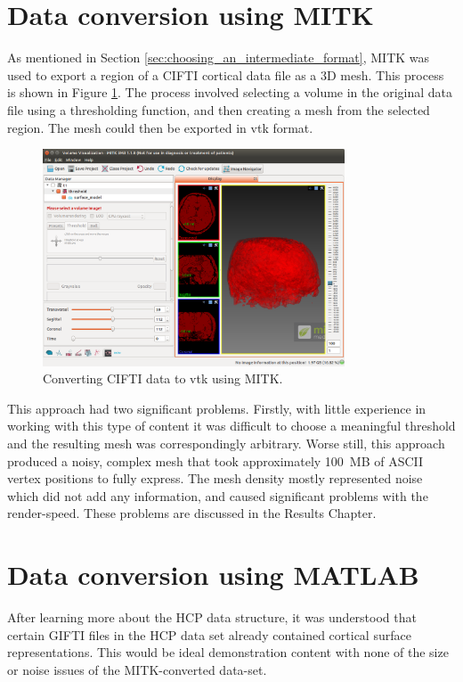 \documentclass[MSc,paper=a4,pagesize=auto]{icldt}
\begin{document}
\section{Data conversion using MITK}
As mentioned in Section \ref{sec:choosing_an_intermediate_format}, MITK was used to export a region of a CIFTI cortical data file as a 3D mesh. This process is shown in Figure \ref{fig:MITK_conversion}. The process involved selecting a volume in the original data file using a thresholding function, and then creating a mesh from the selected region. The mesh could then be exported in vtk format.

\begin{figure}[htbp!]
    \centering
    \includegraphics[width=0.8\textwidth]{resources/MITK_conversion}
    \caption{Converting CIFTI data to vtk using MITK.}
    \label{fig:MITK_conversion}
\end{figure}

This approach had two significant problems. Firstly, with little experience in working with this type of content it was difficult to choose a meaningful threshold and the resulting mesh was correspondingly arbitrary. Worse still, this approach produced a noisy, complex mesh that took approximately \SI{100}{MB} of ASCII vertex positions to fully express. The mesh density mostly represented noise which did not add any information, and caused significant problems with the render-speed. These problems are discussed in the Results Chapter.

\section{Data conversion using MATLAB}
After learning more about the HCP data structure, it was understood that certain GIFTI files in the HCP data set already contained cortical surface representations. This would be ideal demonstration content with none of the size or noise issues of the MITK-converted data-set. 
\end{document}
